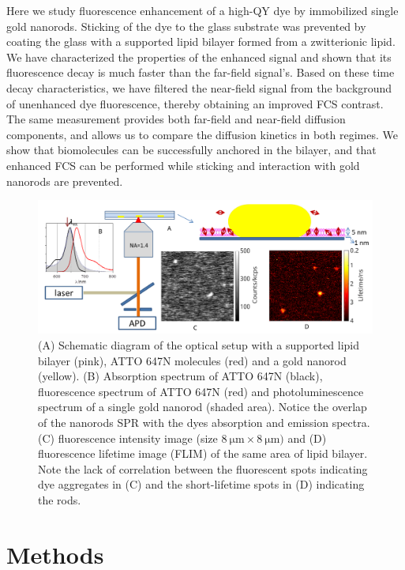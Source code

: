 Here we study fluorescence enhancement of a high-QY dye by immobilized single gold nanorods.
Sticking of the dye to the glass substrate was prevented by coating the glass with a supported lipid bilayer formed from a zwitterionic lipid.
We have characterized the properties of the enhanced signal and shown that its fluorescence decay is much faster than the far-field signal’s.
Based on these time decay characteristics, we have filtered the near-field signal from the background of unenhanced dye fluorescence, thereby obtaining an improved FCS contrast.
The same measurement provides both far-field and near-field diffusion components, and allows us to compare the diffusion kinetics in both regimes. 
We show that biomolecules can be successfully anchored in the bilayer, and that enhanced FCS can be performed while sticking and interaction with gold nanorods are prevented.
\begin{figure}
	\centering
	\includegraphics[width=\textwidth]{schematic_efcs}
	\caption{(A) Schematic diagram of the optical setup with a supported lipid bilayer (pink), ATTO 647N molecules (red) and a gold nanorod (yellow).
	(B) Absorption spectrum of ATTO 647N (black), fluorescence spectrum of ATTO 647N (red) and photoluminescence spectrum of a single gold nanorod (shaded area).
	Notice the overlap of the nanorod\textquotesingle s SPR with the dye\textquotesingle s absorption and emission spectra.
	(C) fluorescence intensity image (size $\SI{8}{\um}\times\SI{8}{\um})$ and (D) fluorescence lifetime image (FLIM) of the same area of 
	lipid bilayer. Note the lack of correlation between the fluorescent spots indicating dye aggregates in (C) and the short-lifetime spots in (D) indicating the rods.}
	\label{fig:schematic}
\end{figure}
\section{Methods}

